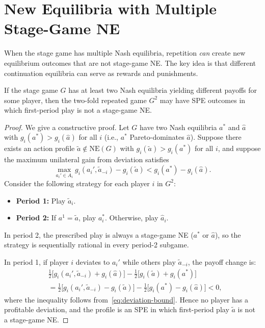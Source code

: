 \documentclass[11pt,a4paper]{article}
\begin{document}

\section{New Equilibria with Multiple Stage-Game NE}
\label{sec:multiple-ne}

When the stage game has multiple Nash equilibria, repetition \emph{can}
create new equilibrium outcomes that are not stage-game NE. The key idea is
that different continuation equilibria can serve as rewards and punishments.

\begin{proposition}
\label{prop:multiple-ne-repetition}
If the stage game $G$ has at least two Nash equilibria yielding different
payoffs for some player, then the two-fold repeated game $G^2$ may have SPE
outcomes in which first-period play is not a stage-game NE.
\end{proposition}

\begin{proof}
We give a constructive proof. Let $G$ have two Nash equilibria $a^*$ and
$\hat{a}$ with $g_i(a^*) > g_i(\hat{a})$ for all $i$ (i.e., $a^*$
Pareto-dominates $\hat{a}$). Suppose there exists an action profile
$\tilde{a} \notin \mathrm{NE}(G)$ with $g_i(\tilde{a}) > g_i(a^*)$ for
all $i$, and suppose the maximum unilateral gain from deviation satisfies
\begin{equation}\label{eq:deviation-bound}
    \max_{a_i' \in A_i} g_i(a_i', \tilde{a}_{-i}) - g_i(\tilde{a})
    < g_i(a^*) - g_i(\hat{a}).
\end{equation}
Consider the following strategy for each player $i$ in $G^2$:
\begin{itemize}
    \item \textbf{Period 1:} Play $\tilde{a}_i$.
    \item \textbf{Period 2:} If $a^1 = \tilde{a}$, play $a_i^*$.
    Otherwise, play $\hat{a}_i$.
\end{itemize}

In period 2, the prescribed play is always a stage-game NE ($a^*$ or
$\hat{a}$), so the strategy is sequentially rational in every period-2
subgame.

In period 1, if player $i$ deviates to $a_i'$ while others play
$\tilde{a}_{-i}$, the payoff change is:
\begin{align*}
    &\frac{1}{2}\bigl[g_i(a_i', \tilde{a}_{-i}) + g_i(\hat{a})\bigr]
    - \frac{1}{2}\bigl[g_i(\tilde{a}) + g_i(a^*)\bigr] \\
    &= \frac{1}{2}\bigl[g_i(a_i', \tilde{a}_{-i}) - g_i(\tilde{a})\bigr]
    - \frac{1}{2}\bigl[g_i(a^*) - g_i(\hat{a})\bigr] < 0,
\end{align*}
where the inequality follows from~\eqref{eq:deviation-bound}. Hence no
player has a profitable deviation, and the profile is an SPE in which
first-period play $\tilde{a}$ is not a stage-game NE.
\end{proof}
\end{document}

